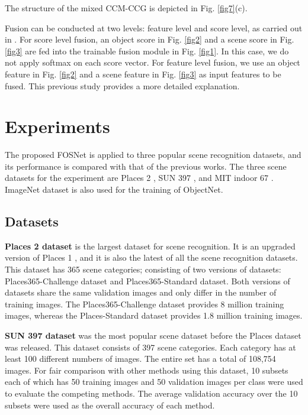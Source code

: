 \documentclass[journal,comsoc]{IEEEtran}
\begin{document}
The structure of the mixed CCM-CCG is depicted in Fig. \ref{fig7}(c). 

Fusion can be conducted at two levels: feature level and score level, as carried out in \cite{b21}. For score level fusion, an object score in Fig. \ref{fig2} and a scene score in Fig. \ref{fig3} are fed into the trainable fusion module in Fig. \ref{fig1}. In this case, we do not apply softmax on each score vector. For feature level fusion, we use an object feature in Fig. \ref{fig2} and a scene feature in Fig. \ref{fig3} as input features to be fused. This previous study \cite{b21} provides a more detailed explanation. 



\section{Experiments}
\label{s4}

The proposed FOSNet is applied to three popular scene recognition datasets, and its performance is compared with that of the previous works. The three scene datasets for the experiment are Places 2 \cite{b20}, SUN 397 \cite{b33}, and MIT indoor 67 \cite{b34}. ImageNet dataset \cite{b19} is also used for the training of ObjectNet.

\subsection{Datasets}
\label{s41}

\textbf{Places 2 dataset} \cite{b20} is the largest dataset for scene recognition. It is an upgraded version of Places 1 \cite{b35}, and it is also the latest of all the scene recognition datasets. This dataset has 365 scene categories; consisting of two versions of datasets: Places365-Challenge dataset and Places365-Standard dataset. Both versions of datasets share the same validation images and only differ in the number of training images. The Places365-Challenge dataset provides 8 million training images, whereas the Places-Standard dataset provides 1.8 million training images.

\textbf{SUN 397 dataset} \cite{b33} was the most popular scene dataset before the Places dataset \cite{b20,b35} was released. This dataset consists of 397 scene categories. Each category has at least 100 different numbers of images. The entire set has a total of 108,754 images. For fair comparison with other methods using this dataset, 10 subsets each of which has 50 training images and 50 validation images per class were used to evaluate the competing methods. The average validation accuracy over the 10 subsets were used as the overall accuracy of each method. 
\end{document}
